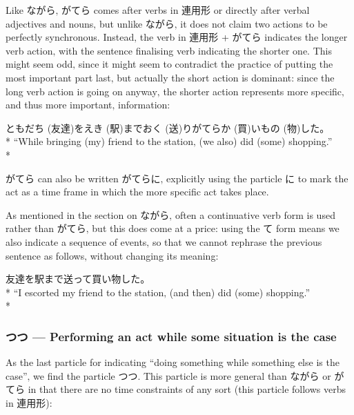 \documentclass[11pt, b5paper, twoside, openright, onecolumn]{book}
\makeatletter
\newcommand*{\rubystack}[2]{{\relscale{0.5}%
  \begin{tabular}[b]{@{}c@{}}%
    {#1}\\%
   {\textscale{2}{#2}}%
  \end{tabular}}%
}
\DeclareRobustCommand*{\ruby}[2]{%
  \mbox{%
    \setlength{\parskip}{0ex}%
    \BeginAccSupp{method=pdfstringdef,ActualText={#1}}%
      \rubystack{\phantom{#2}}{#1}%
      \llap{%
        \rubystack{#2}{\phantom{#1}}%
      }%
    \EndAccSupp{}%
  }%
}
\renewcommand*{\ruby}[2]{#2 (#1)}%
\newenvironment{exampleblock}{
\setlength{\parindent}{0.6in}
\begin{minipage}[t]{\dimexpr\textwidth-\parindent}}
{\end{minipage}}
\makeatother
\begin{document}
Like ながら‚ がてら comes after verbs in 連用形 or directly after verbal adjectives and nouns‚ but unlike ながら‚ it does not claim two actions to be perfectly synchronous. Instead‚ the verb in 連用形 + がてら indicates the longer verb action‚ with the sentence finalising verb indicating the shorter one. This might seem odd‚ since it might seem to contradict the practice of putting the most important part last‚ but actually the short action is dominant: since the long verb action is going on anyway‚ the shorter action represents more specific‚ and thus more important‚ information:

\vspace{0.4cm}
\begin{exampleblock}
\ruby{友達}{ともだち}を\ruby{駅}{えき}まで\ruby{送}{おく}りがてら\ruby{買}{か}い\ruby{物}{もの}した。 \\* 
“While bringing (my) friend to the station‚ (we also) did (some) shopping.” \\* 
\end{exampleblock}
\vspace{0.2cm}

がてら can also be written がてらに‚ explicitly using the particle に to mark the act as a time frame in which the more specific act takes place.

As mentioned in the section on ながら‚ often a continuative verb form is used rather than がてら‚ but this does come at a price: using the て form means we also indicate a sequence of events‚ so that we cannot rephrase the previous sentence as follows‚ without changing its meaning:

\vspace{0.4cm}
\begin{exampleblock}
友達を駅まで送って買い物した。 \\* 
“I escorted my friend to the station‚ (and then) did (some) shopping.” \\* 
\end{exampleblock}
\subsubsection{つつ — Performing an act while some situation is the case}


As the last particle for indicating “doing something while something else is the case”‚ we find the particle つつ. This particle is more general than ながら or がてら in that there are no time constraints of any sort (this particle follows verbs in 連用形):
\end{document}
